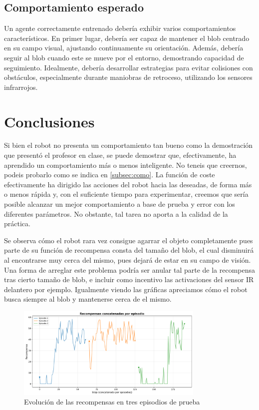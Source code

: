 \documentclass[12pt,a4paper]{article}
\begin{document}
\subsection{Comportamiento esperado}

Un agente correctamente entrenado debería exhibir varios comportamientos
característicos. En primer lugar, debería ser capaz de mantener el blob centrado
en su campo visual, ajustando continuamente su orientación. Además, debería
seguir al blob cuando este se mueve por el entorno, demostrando
capacidad de seguimiento. 
Idealmente, debería desarrollar estrategias para evitar colisiones con
obstáculos, especialmente durante maniobras de retroceso, utilizando
los sensores infrarrojos.

\section{Conclusiones}

Si bien el robot no presenta un comportamiento tan bueno como la demostración que presentó el profesor en clase, se puede demostrar que, efectivamente, ha aprendido un comportamiento más o menos inteligente. No teneis que creernos, podeis probarlo como se indica en \ref{subsec:como}. La función de coste efectivamente ha dirigido las acciones del robot hacia las deseadas, de forma más o menos rápida y, con el suficiente tiempo para experimentar, creemos que sería posible alcanzar un mejor comportamiento a base de prueba y error con los diferentes parámetros. No obstante, tal tarea no aporta a la calidad de la práctica. 

Se observa cómo el robot rara vez consigue agarrar el objeto completamente pues parte de su función de recompensa consta del tamaño del blob, el cual disminuirá al encontrarse muy cerca del mismo, pues dejará de estar en su campo de visión. Una forma de arreglar este problema podría ser anular tal parte de la recompensa tras cierto tamaño de blob, e incluir como incentivo las activaciones del sensor IR delantero por ejemplo. Igualmente viendo las gráficas apreciamos cómo el robot busca siempre al blob y mantenerse cerca de el mismo.

\begin{figure}[h]
    \centering
    \includegraphics[width=0.8\textwidth]{histRecompensas.png}
    \caption{Evolución de las recompensas en tres episodios de prueba}
    \label{fig:etiqueta}
\end{figure}
\end{document}
